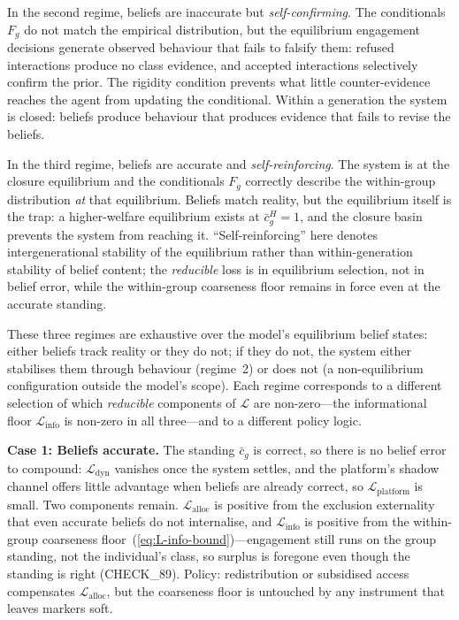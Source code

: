 \documentclass[12pt,a4paper]{article}
\theoremstyle{definition}
\numberwithin{proposition}{section}
\begin{document}
In the second regime, beliefs are inaccurate but \emph{self-confirming}.
The conditionals $F_g$ do not match the empirical distribution, but
the equilibrium engagement decisions generate observed behaviour
that fails to falsify them: refused interactions produce no class
evidence, and accepted interactions selectively confirm the prior.
The rigidity condition prevents what little counter-evidence reaches
the agent from updating the conditional. Within a generation the
system is closed: beliefs produce behaviour that produces evidence
that fails to revise the beliefs.

In the third regime, beliefs are accurate and \emph{self-reinforcing}.
The system is at the closure equilibrium and the conditionals $F_g$
correctly describe the within-group distribution \emph{at} that
equilibrium. Beliefs match reality, but the equilibrium itself is
the trap: a higher-welfare equilibrium exists at $\bar{c}_g^H = 1$,
and the closure basin prevents the system from reaching it.
``Self-reinforcing'' here denotes intergenerational stability of the
equilibrium rather than within-generation stability of belief content;
the \emph{reducible} loss is in equilibrium selection, not in belief
error, while the within-group coarseness floor remains in force even at
the accurate standing.

These three regimes are exhaustive over the model's equilibrium
belief states: either beliefs track reality or they do not; if they
do not, the system either stabilises them through behaviour
(regime~2) or does not (a non-equilibrium configuration outside the
model's scope). Each regime corresponds to a different selection of
which \emph{reducible} components of $\mathcal{L}$ are non-zero---the
informational floor $\mathcal{L}_{\text{info}}$ is non-zero in all
three---and to a different policy logic.

\textbf{Case 1: Beliefs accurate.}
The standing $\bar{c}_g$ is correct, so there is no belief error to
compound: $\mathcal{L}_{\text{dyn}}$ vanishes once the system settles,
and the platform's shadow channel offers little advantage when beliefs
are already correct, so $\mathcal{L}_{\text{platform}}$ is small. Two
components remain. $\mathcal{L}_{\text{alloc}}$ is positive from the
exclusion externality that even accurate beliefs do not internalise,
and $\mathcal{L}_{\text{info}}$ is positive from the within-group
coarseness floor~(\ref{eq:L-info-bound})---engagement still runs on the
group standing, not the individual's class, so surplus is foregone even
though the standing is right (CHECK\_89). Policy: redistribution or
subsidised access compensates $\mathcal{L}_{\text{alloc}}$, but the
coarseness floor is untouched by any instrument that leaves markers
soft.
\end{document}
